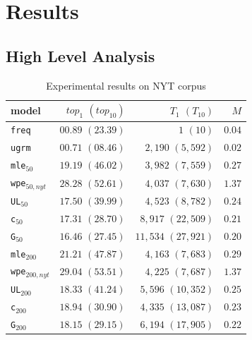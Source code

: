 \documentclass[11pt,a4paper]{article}
\begin{document}
\section{Results}\label{sec:results}


\subsection{High Level Analysis}\label{high_ana}
\begin{table}[h]
\begin{center}
\begin{tabular}{lrrr}
model &  $top_{1}$ $(top_{10})$ & $T_{1}$ $(T_{10})$ & $M$ \\ \hline
\texttt{freq} & $00.89$ $(23.39)$ & $1$ $(10)$  &  $0.04$\\
\texttt{ugrm} & $00.71$ $(08.46)$ & $2,190$ $(5,592)$ & $0.02$ \\
\addlinespace[1ex]

{\tt mle}$_{50}$ & $19.19$ $(46.02)$ & $3,982$ $(7,559)$ & $0.27$  \\
{\tt wpe}$_{50,nyt}$ & $28.28$ $(52.61)$ & $4,037$ $(7,630)$ & $1.37$ \\

{\tt UL}$_{50}$ & $17.50$ $(39.99)$ & $4,523$ $(8,782)$ & $0.24$ \\
{\tt c}$_{50}$ & $17.31$ $(28.70)$ & $8,917$ $(22,509)$&  $0.21$  \\
{\tt G}$_{50}$ & $16.46$ $(27.45)$ & $11,534$ $(27,921)$ & $0.20$   \\
\addlinespace[1ex]

{\tt mle}$_{200}$ & $21.21$ $(47.87)$ & $4,163$ $(7,683)$ & $0.29$ \\
{\tt wpe}$_{200,nyt}$ & $29.04$ $(53.51)$ & $4,225$ $(7,687)$ & $1.37$ \\
{\tt UL}$_{200}$ & $18.33$ $(41.24)$ & $5,596$ $(10,352)$ & $0.25$ \\
{\tt c}$_{200}$ & $18.94$ $(30.90)$ & $4,335$ $(13,087)$ & $0.23$  \\
{\tt G}$_{200}$ & $18.15$ $(29.15)$ &  $6,194$ $(17,905)$ & $0.22$  \\ 
\end{tabular}
\end{center}
\vspace{-0.1in}
\caption{\label{nyt} Experimental results on NYT corpus}
\vspace{-0.1in}
\end{table}
\end{document}
